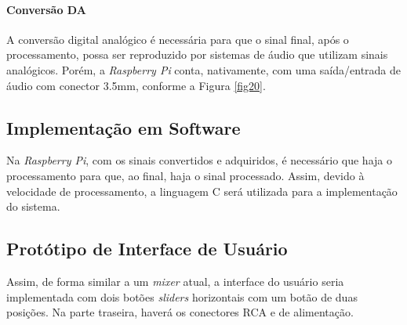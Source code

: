     \paragraph{Conversão DA}

    A conversão digital analógico é necessária para que o sinal final, após o processamento, possa ser reproduzido por sistemas de áudio que utilizam sinais analógicos. Porém, a \textit{Raspberry Pi} conta, nativamente, com uma saída/entrada de áudio com conector 3.5mm, conforme a Figura \ref{fig20}.
    
    
    \subsection{Implementação em Software}

    Na \textit{Raspberry Pi}, com os sinais convertidos e adquiridos, é necessário que haja o processamento para que, ao final, haja o sinal processado. Assim, devido à velocidade de processamento, a linguagem C será utilizada para a implementação do sistema. 
        
    \subsection{Protótipo de Interface de Usuário}

        Assim, de forma similar a um \textit{mixer} atual, a interface do usuário seria implementada com dois botões \textit{sliders} horizontais com um botão de duas posições. Na parte traseira, haverá os conectores RCA e de alimentação.
